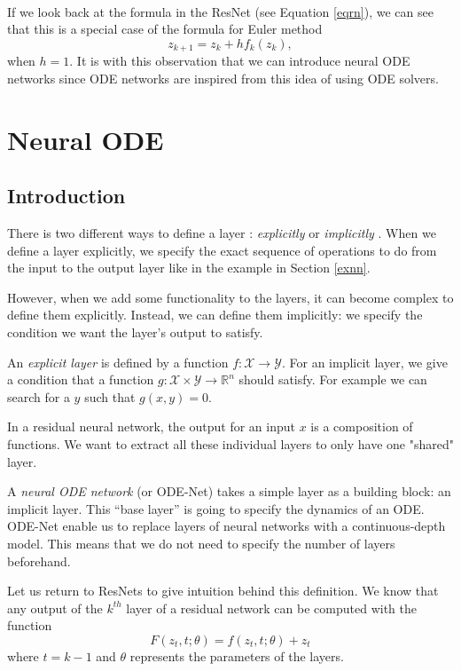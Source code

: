 \documentclass[10pt,a4paper]{article}
\theoremstyle{definition}
\theoremstyle{plain}
\begin{document}
~

If we look back at the formula in the ResNet (see Equation \ref{eqrn}), we can see that this is a special case of the formula for Euler method
\begin{equation*}
z_{k+1} = z_k + hf_k(z_k),
\end{equation*}
when $h = 1$. It is with this observation that we can introduce neural ODE networks since ODE networks are inspired from this idea of using ODE solvers.

\section{Neural ODE} \label{neuralode}

\subsection{Introduction}

There is two different ways to define a layer : \textit{explicitly} or \textit{implicitly} \cite{2}. When we define a layer explicitly, we specify the exact sequence of operations to do from the input to the output layer like in the example in Section \ref{exnn}. 

However, when we add some functionality to the layers, it can become complex to define them explicitly. Instead, we can define them implicitly: we specify the condition we want the layer's output to satisfy. 

An \textit{explicit layer} is defined by a function $f : \mathcal{X} \rightarrow \mathcal{Y}$. For an implicit layer, we give a condition that a function $g: \mathcal{X} \times \mathcal{Y} \rightarrow \mathbb{R}^n$ should satisfy. For example we can search for a $y$ such that $g(x,y) = 0$.

In a residual neural network, the output for an input $x$ is a composition of functions. We want to extract all these individual layers to only have one "shared" layer.

A \textit{neural ODE network} (or ODE-Net) \cite{2,3,12} takes a simple layer as a building block: an implicit layer. This “base layer” is going to specify the dynamics of an ODE.
ODE-Net enable us to replace layers of neural networks with a continuous-depth model. This means that we do not need to specify the number of layers beforehand.

Let us return to ResNets to give intuition behind this definition. We know that any output of the $k^{th}$ layer of a residual network can be computed with the function
\begin{equation*}
F(z_t, t; \theta) = f(z_t, t;\theta) + z_t
\end{equation*}
where $t = k - 1$ and $\theta$ represents the parameters of the layers.
\end{document}
